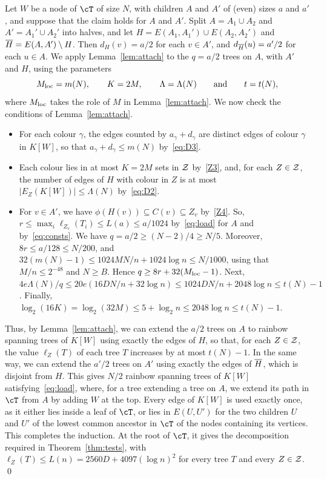 Let $W$ be a node of $\cT$ of size $N$, with children $A$ and $A'$ of (even) sizes $a$ and $a'$, and suppose that the claim holds for $A$ and $A'$.
Split $A=A_1\cup A_2$ and $A'=A_1'\cup A_2'$ into halves, and let $H=E(A_1,A_1')\cup E(A_2,A_2')$ and $\overline{H}=E(A,A')\setminus H$. Then $d_H(v)=a/2$ for each $v\in A'$, and $d_{\overline{H}}(u)=a'/2$ for each $u\in A$.
We apply Lemma~\ref{lem:attach} to the $q=a/2$ trees on $A$, with $A'$ and $H$, using the parameters
\[M_{\rm loc}=m(N),\qquad K=2M,\qquad\Lambda=\Lambda(N)\qquad\text{and}\qquad t=t(N),\]
where $M_{\rm loc}$ takes the role of $M$ in Lemma~\ref{lem:attach}.
We now check the conditions of Lemma~\ref{lem:attach}.
\begin{itemize}
\item[\ref{att:mult}] For each colour $\gamma$, the edges counted by $a_\gamma+d_\gamma$ are distinct edges of colour $\gamma$ in $K[W]$, so that $a_\gamma+d_\gamma\le m(N)$ by~\eqref{eq:D3}.
\item[\ref{att:Z}] Each colour lies in at most $K=2M$ sets in $\mathcal{Z}$ by~\ref{Z3}, and, for each $Z\in \mathcal{Z}$, the number of edges of $H$ with colour in $Z$ is at most $|E_Z(K[W])|\le\Lambda(N)$ by~\eqref{eq:D2}.
\item[\ref{att:ineq}] For $v\in A'$, we have $\phi(H(v))\subseteq C(v)\subseteq Z_v$ by~\ref{Z4}. So, $r\le\max_i\ell_{Z_v}(T_i)\le L(a)\le a/1024$ by~\eqref{eq:load} for $A$ and by~\eqref{eq:consts}.
We have $q=a/2\ge (N-2)/4\ge N/5$. Moreover, $8r\le a/128\le N/200$, and $32(m(N)-1)\le1024MN/n+1024\log n\le N/1000$, using that $M/n\le2^{-48}$ and $N\ge B$. Hence $q\ge8r+32(M_{\rm loc}-1)$.
Next, $4e\Lambda(N)/q\le20e(16DN/n+32\log n)\le1024DN/n+2048\log n\le t(N)-1$.
Finally, $\log_2(16K)=\log_2(32M)\le5+\log_2n\le2048\log n\le t(N)-1$.
\end{itemize}
Thus, by Lemma~\ref{lem:attach}, we can extend the $a/2$ trees on $A$ to rainbow spanning trees of $K[W]$ using exactly the edges of $H$, so that, for each $Z\in \mathcal{Z}$, the value $\ell_Z(T)$ of each tree $T$ increases by at most $t(N)-1$.
In the same way, we can extend the $a'/2$ trees on $A'$ using exactly the edges of $\overline{H}$, which is disjoint from $H$.
This gives $N/2$ rainbow spanning trees of $K[W]$ satisfying~\eqref{eq:load}, where, for a tree extending a tree on $A$, we extend its path in $\cT$ from $A$ by adding $W$ at the top.
Every edge of $K[W]$ is used exactly once, as it either lies inside a leaf of $\cT$, or lies in $E(U,U')$ for the two children $U$ and $U'$ of the lowest common ancestor in $\cT$ of the nodes containing its vertices.
This completes the induction. At the root of $\cT$, it gives the decomposition required in Theorem~\ref{thm:tests}, with $\ell_Z(T)\le L(n)=2560D+4097(\log n)^2$ for every tree $T$ and every $Z\in \mathcal{Z}$. \qed
